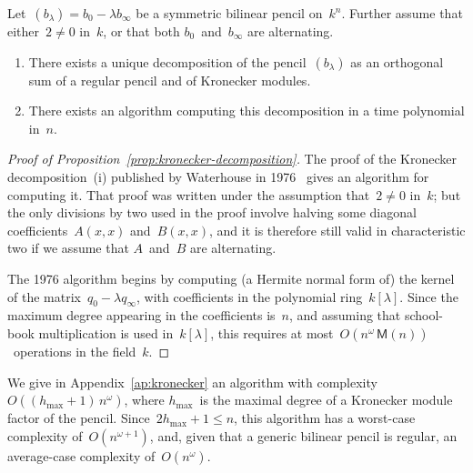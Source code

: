 \documentclass{amsart}
\def\proofof{Proof of }
\def\M{\mathsf{M}}
\begin{document}

\begin{prop}\label{prop:kronecker-decomposition}
Let~$(b_{λ}) = b_0 - λ b_∞$ be a symmetric bilinear pencil on~$k^n$.
Further assume that either~$2 ≠ 0$ in~$k$,
or that both $b_0$~and~$b_∞$ are alternating.
\begin{enumerate}
\item There exists a unique decomposition of the pencil~$(b_λ)$
as an orthogonal sum of a regular pencil
and of Kronecker modules.
\item There exists an algorithm computing this decomposition
in a time polynomial in~$n$.
\end{enumerate}
\end{prop}
\begin{proof}[\proofof Proposition~\ref{prop:kronecker-decomposition}]
The proof of the Kronecker decomposition~(i) published
by Waterhouse in 1976~\cite[Theorem 3.1]{inventiones1976waterhouse}
gives an algorithm for computing it.
That proof was written under the assumption that~$2 ≠ 0$ in~$k$;
but the only divisions by two used in the proof
involve halving some diagonal coefficients~$A(x,x)$ and~$B(x,x)$,
and it is therefore still valid in characteristic two
if we assume that $A$~and~$B$ are alternating.

The 1976 algorithm begins by computing (a Hermite normal form of)
the kernel of the matrix~$q_0 - λ q_∞$,
with coefficients in the polynomial ring~$k[λ]$.
Since the maximum degree appearing in the coefficients is~$n$,
and assuming that school-book multiplication is used in~$k[λ]$,
this requires at most~$O(n^ω\, \M(n))$~operations in the field~$k$.
\end{proof}

We give in Appendix~\ref{ap:kronecker} an algorithm
with complexity~$O((h_{\max}+1)\,n^ω)$,
where $h_{\max}$~is the maximal degree of
a Kronecker module factor of the pencil.
Since~$2h_{\max}+1 ≤ n$,
this algorithm has a worst-case complexity of~$O(n^{ω+1})$,
and, given that a generic bilinear pencil is regular,
an average-case complexity of~$O(n^ω)$.
\end{document}
